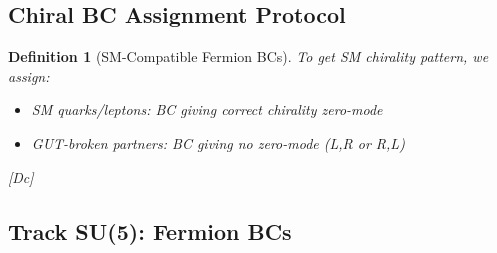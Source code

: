 \documentclass[11pt,a4paper]{article}
\newtheorem{definition}[theorem]{Definition}
\newcommand{\tagDc}{\textcolor{blue!50!black}{[Dc]}}
\begin{document}
\subsection{Chiral BC Assignment Protocol}

\begin{definition}[SM-Compatible Fermion BCs]
\label{def:sm-ferm-bc}
To get SM chirality pattern, we assign:
\begin{itemize}
    \item SM quarks/leptons: BC giving correct chirality zero-mode
    \item GUT-broken partners: BC giving no zero-mode (L,R or R,L)
\end{itemize}
\tagDc
\end{definition}

\subsection{Track SU(5): Fermion BCs}
\end{document}
